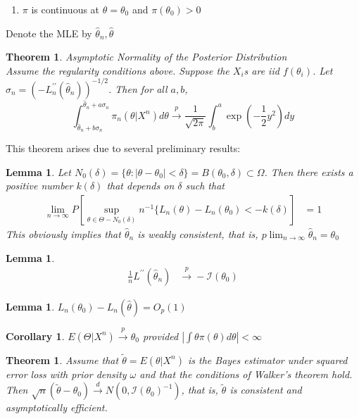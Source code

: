 \documentclass[letterpaper,11pt]{article}
\newcounter{Cx}
\newcommand{\itemC}{%
    \addtocounter{Cx}{1}
    \item[C\theCx.]}
\newcommand{\convprob}{\overset{p}\rightarrow}
\newcommand{\convdist}{\overset{d}\rightarrow}
\newcommand{\conv}{\rightarrow}
\newcommand{\FI}{\mathcal{I}}
\newcounter{thm}
\newtheorem{theorem}[thm]{Theorem}
\newtheorem{lemma}[thm]{Lemma}
\newtheorem{cor}[thm]{Corollary}
\theoremstyle{definition}
\begin{document}
\begin{enumerate}
\itemC $\pi$ is continuous at $\theta=\theta_0$ and $\pi(\theta_0)>0$
\end{enumerate}
Denote the MLE by $\hat\theta_n, \hat\theta$

\begin{theorem}{Asymptotic Normality of the Posterior Distribution}\\
Assume the regularity conditions above. Suppose the $X_i$s are iid $f(\theta_i)$. Let $\sigma_n = \left(-L^{\prime\prime}_n(\hat\theta_n)\right)^{-1/2}$. Then for all $a,b$,
$$\int_{\hat\theta_n+b\sigma_n}^{\hat\theta_n+a\sigma_n}\pi_n(\theta|X^n)d\theta \convprob \frac{1}{\sqrt{2\pi}}\int_b^a \exp\left(-\frac{1}{2}y^2\right) dy$$
\end{theorem}

This theorem arises due to several preliminary results:
\begin{lemma}
Let $N_0(\delta) = \{\theta:|\theta-\theta_0|<\delta\} = B(\theta_0,\delta)\subset\Omega$. Then there exists a positive number $k(\delta)$ that depends on $\delta$ such that
\begin{align}\lim_{n\conv\infty}P\left[\sup_{\theta\in\Theta-N_0(\delta)} n^{-1}\{L_n(\theta)-L_n(\theta_0)<-k(\delta)\right]&=1\end{align}
This obviously implies that $\hat\theta_n$ is weakly consistent, that is, $p\displaystyle\lim_{n\conv\infty}\hat\theta_n = \theta_0$
\end{lemma}

\begin{lemma}
\begin{align}\frac{1}{n}L^{\prime\prime}(\hat\theta_n)&\convprob -\FI(\theta_0)\end{align}
\end{lemma}

\begin{lemma}
$L_n(\theta_0) - L_n(\hat\theta) = O_p(1)$
\end{lemma}

\begin{cor}$E(\Theta|X^n) \convprob \theta_0$ provided $\left|\int\theta\pi(\theta)d\theta\right|<\infty$
\end{cor}

\begin{theorem}
Assume that $\tilde\theta = E(\theta|X^n)$ is the Bayes estimator under squared error loss with prior density $\omega$ and that the conditions of Walker's theorem hold. Then $\sqrt{n}(\tilde\theta-\theta_0)\convdist N(0,\FI(\theta_0)^{-1})$, that is, $\tilde\theta$ is consistent and asymptotically efficient.

\end{theorem}

\end{document}
